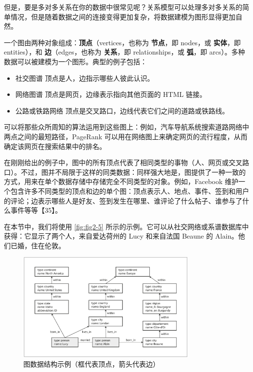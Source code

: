 但是，要是多对多关系在你的数据中很常见呢？关系模型可以处理多对多关系的简单情况，但是随着数据之间的连接变得更加复杂，将数据建模为图形显得更加自然。

一个图由两种对象组成：\textbf{顶点}（vertices，也称为 \textbf{节点}，即 nodes，或 \textbf{实体}，即 entities），和 \textbf{边}（edges，也称为 \textbf{关系}，即 relationships，或 \textbf{弧}，即 arcs）。多种数据可以被建模为一个图形。典型的例子包括：

\begin{itemize}
    \item 社交图谱
          顶点是人，边指示哪些人彼此认识。
    \item 网络图谱
          顶点是网页，边缘表示指向其他页面的 HTML 链接。
    \item 公路或铁路网络
          顶点是交叉路口，边线代表它们之间的道路或铁路线。
\end{itemize}

可以将那些众所周知的算法运用到这些图上：例如，汽车导航系统搜索道路网络中两点之间的最短路径，PageRank 可以用在网络图上来确定网页的流行程度，从而确定该网页在搜索结果中的排名。

在刚刚给出的例子中，图中的所有顶点代表了相同类型的事物（人、网页或交叉路口）。不过，图并不局限于这样的同类数据：同样强大地是，图提供了一种一致的方式，用来在单个数据存储中存储完全不同类型的对象。例如，Facebook 维护一个包含许多不同类型的顶点和边的单个图：顶点表示人、地点、事件、签到和用户的评论；边表示哪些人是好友、签到发生在哪里、谁评论了什么帖子、谁参与了什么事件等等【35】。

在本节中，我们将使用 \autoref{fig:fig2-5} 所示的示例。它可以从社交网络或系谱数据库中获得：它显示了两个人，来自爱达荷州的 Lucy 和来自法国 Beaune 的 Alain。他们已婚，住在伦敦。

\begin{figure}
    \includegraphics[width=0.8\textwidth]{img/fig2-5.png}
    \caption{图数据结构示例（框代表顶点，箭头代表边）}
    \label{fig:fig2-5}
\end{figure}

